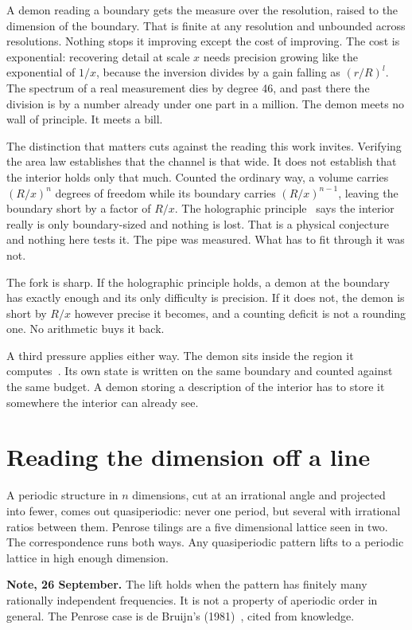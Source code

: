 A demon reading a boundary gets the measure over the resolution, raised to the dimension of the
boundary. That is finite at any resolution and unbounded across resolutions. Nothing stops it
improving except the cost of improving. The cost is exponential: recovering detail at scale $x$
needs precision growing like the exponential of $1/x$, because the inversion divides by a gain
falling as $(r/R)^l$. The spectrum of a real measurement dies by degree 46, and past there the
division is by a number already under one part in a million. The demon meets no wall of principle.
It meets a bill.

The distinction that matters cuts against the reading this work invites. Verifying the area law
establishes that the channel is that wide. It does not establish that the interior holds only that
much. Counted the ordinary way, a volume carries $(R/x)^n$ degrees of freedom while its boundary
carries $(R/x)^{n-1}$, leaving the boundary short by a factor of $R/x$. The holographic principle~\cite{src:t-Hooft-1993,src:Susskind-1995} says
the interior really is only boundary-sized and nothing is lost. That is a physical conjecture and
nothing here tests it. The pipe was measured. What has to fit through it was not.

The fork is sharp. If the holographic principle holds, a demon at the boundary has exactly enough
and its only difficulty is precision. If it does not, the demon is short by $R/x$ however precise it
becomes, and a counting deficit is not a rounding one. No arithmetic buys it back.

A third pressure applies either way. The demon sits inside the region it computes~\cite{src:Wolpert-2008}. Its own state
is written on the same boundary and counted against the same budget. A demon storing a description
of the interior has to store it somewhere the interior can already see.

\section{Reading the dimension off a line}

A periodic structure in $n$ dimensions, cut at an irrational angle and projected into fewer, comes
out quasiperiodic: never one period, but several with irrational ratios between them. Penrose
tilings are a five dimensional lattice seen in two. The correspondence runs both ways. Any
quasiperiodic pattern lifts to a periodic lattice in high enough dimension.

\textbf{Note, 26 September.} The lift holds when the pattern has finitely many rationally independent frequencies. It is not a property of aperiodic order in general. The Penrose case is de Bruijn's (1981)~\cite{src:de-Bruijn-1981}, cited from knowledge.

